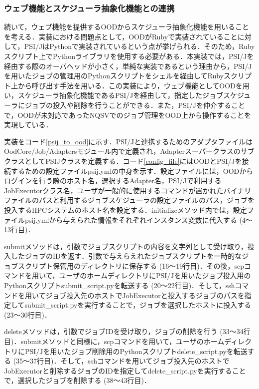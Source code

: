 \subsubsection{ウェブ機能とスケジューラ抽象化機能との連携}
続いて，ウェブ機能を提供するOODからスケジューラ抽象化機能を用いることを考える．実装における問題点として，OODがRubyで実装されていることに対して，PSI/JはPythonで実装されているという点が挙げられる\cite{cite9}\cite{cite10}．そのため，Rubyスクリプト上でPythonライブラリを使用する必要がある．本実装では，PSI/Jを経由する際のオーバヘッドが小さく，単純な実装であるという理由から，PSI/Jを用いたジョブの管理用のPythonスクリプトをシェルを経由してRubyスクリプト上から呼び出す手法を用いる．この実装により，ウェブ機能としてOODを用い，スケジューラ抽象化機能であるPSI/Jを経由して，指定したジョブスケジューラにジョブの投入や削除を行うことができる．また，PSI/Jを仲介することで，OODが未対応であったNQSVでのジョブ管理をOOD上から操作することを実現している．\par
実装をコード\ref{psij_to_ood}に示す．PSI/Jと連携するためのアダプタファイルはOodCore/Job/Adaptersモジュール内で定義され，AdapterスーパークラスのサブクラスとしてPSIJクラスを定義する．コード\ref{config_file}にはOODとPSI/Jを接続するための設定ファイルpsij.ymlの中身を示す．設定ファイルには，OODからログインを行う際のホスト名，選択するAdapter名，PSI/Jで利用するJobExecutorクラス名，ユーザが一般的に使用するコマンドが置かれたバイナリファイルのパスと利用するジョブスケジューラの設定ファイルのパス，ジョブを投入するHPCシステムのホスト名を設定する．initializeメソッド内では，設定ファイルpsij.ymlから与えられた情報をそれぞれインスタンス変数に代入する (4～13行目)．\par
submitメソッドは，引数でジョブスクリプトの内容を文字列として受け取り，投入したジョブのIDを返す．引数で与えらえれたジョブスクリプトを一時的なジョブスクリプト保管用のディレクトリに保存する (16～19行目)．その後，scpコマンドを用いて，ユーザのホームディレクトリにPSI/Jを用いたジョブ投入用のPythonスクリプトsubmit\_script.pyを転送する (20～22行目)．そして，sshコマンドを用いてジョブ投入先のホストでJobExecutorと投入するジョブのパスを指定してsubmit\_script.pyを実行することで，ジョブを選択したホストに投入する (23～30行目)．\par
deleteメソッドは，引数でジョブIDを受け取り，ジョブの削除を行う (33～34行目)．submitメソッドと同様に，scpコマンドを用いて，ユーザのホームディレクトリにPSI/Jを用いたジョブ削除用のPythonスクリプトdelete\_script.pyを転送する (35～37行目)．そして，sshコマンドを用いてジョブ投入先のホストでJobExecutorと削除するジョブのIDを指定してdelete\_script.pyを実行することで，選択したジョブを削除する (38～43行目)．

